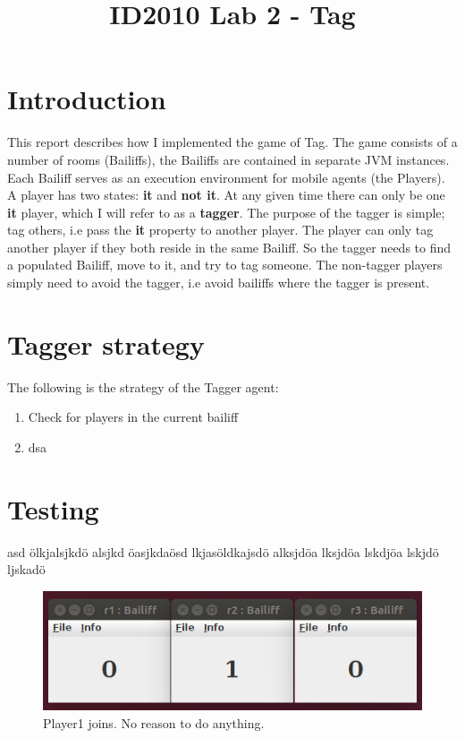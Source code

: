 \documentclass[conference, a4paper]{IEEEtran}
\begin{document}
\title{ID2010 Lab 2 - Tag}


\author{
}
\maketitle

\IEEEpeerreviewmaketitle


\section{Introduction}
This report describes how I implemented the game of Tag. The game consists of a number of rooms (Bailiffs), the Bailiffs are contained in separate JVM instances. Each Bailiff serves as an execution environment for mobile agents (the Players). A player has two states: \textbf{it} and \textbf{not it}. At any given time there can only be one \textbf{it} player, which I will refer to as a \textbf{tagger}. The purpose of the tagger is simple; tag others, i.e pass the \textbf{it} property to another player. The player can only tag another player if they both reside in the same Bailiff. So the tagger needs to find a populated Bailiff, move to it, and try to tag someone. The non-tagger players simply need to avoid the tagger, i.e avoid bailiffs where the tagger is present.

\section{Tagger strategy}
The following is the strategy of the Tagger agent:
\begin{enumerate}
	\item Check for players in the current bailiff
	\item dsa
\end{enumerate}

\section{Testing}
asd ölkjalsjkdö alsjkd öasjkdaösd lkjasöldkajsdö alksjdöa lksjdöa lskdjöa lskjdö ljskadö 
\begin{figure}[h!]
	\centering
	\includegraphics[scale=0.4]{010}
	\caption{Player1 joins. No reason to do anything.}
	\label{fig010}
\end{figure}
\end{document}
